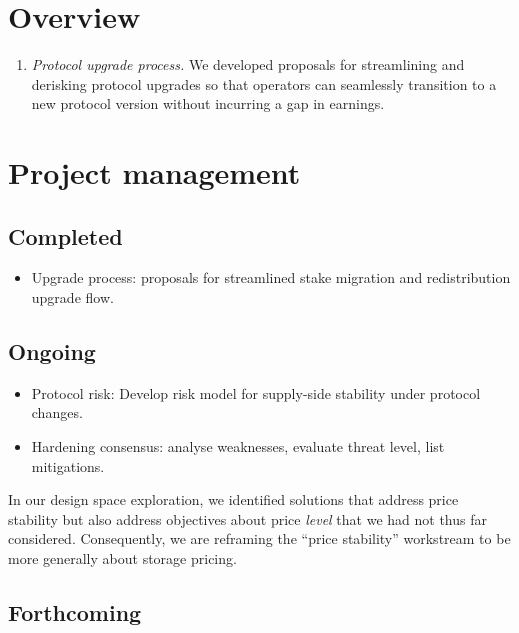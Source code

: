 \maketitle
\section*{Overview}

\begin{enumerate}
  \item \emph{Protocol upgrade process.} We developed proposals for streamlining and derisking protocol upgrades so that operators can seamlessly transition to a new protocol version without incurring a gap in earnings.

\end{enumerate}

\section*{Project management}

\subsection*{Completed}

\begin{itemize}
  \item Upgrade process: proposals for streamlined stake migration and redistribution upgrade flow.
\end{itemize}

\subsection*{Ongoing}

\begin{itemize}
  \item Protocol risk: Develop risk model for supply-side stability under protocol changes.
  \item Hardening consensus: analyse weaknesses, evaluate threat level, list mitigations.
\end{itemize}


In our design space exploration, we identified solutions that address price stability but also address objectives about price \emph{level} that we had not thus far considered.
%
Consequently, we are reframing the ``price stability'' workstream to be more generally about storage pricing.

\subsection*{Forthcoming}

